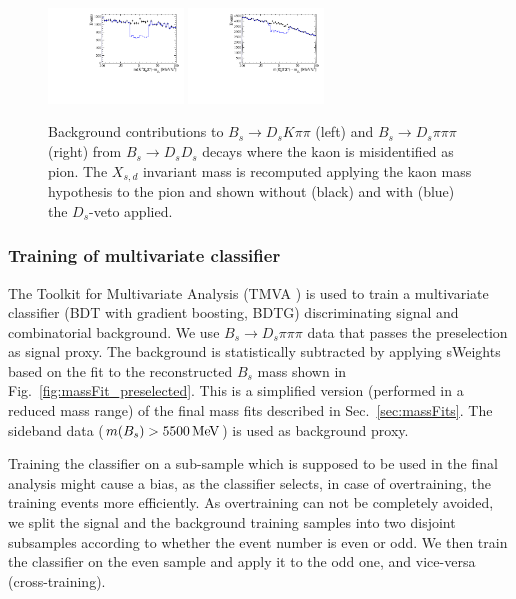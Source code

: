 \begin{figure}[h]
\centering
\includegraphics[height=!,width=0.32\textwidth]{figs/BkgStudies/signal_Bs2DsKpipi_as_Bs2DsDs_compareVeto.pdf} 
\includegraphics[height=!,width=0.32\textwidth]{figs/BkgStudies/norm_Bs2Dspipipi_as_Bs2DsDs_compareVeto.pdf} 
\caption{Background contributions to  $B_s \to D_s K\pi\pi$ (left) and $B_s \to D_s \pi\pi\pi$ (right) from $B_s \to D_s D_s$ decays where the kaon is misidentified as pion.
The $X_{s,d}$ invariant mass is recomputed applying the kaon mass hypothesis to the pion and shown without (black) and with (blue) the $D_s$-veto applied. 
}
\label{fig:vetoDs}
\end{figure}



\clearpage
\subsubsection{Training of multivariate classifier}

The Toolkit for Multivariate Analysis (TMVA \cite{Hocker:2007ht}) is used to train a multivariate classifier (BDT with gradient boosting, BDTG)
discriminating signal and combinatorial background.
We use $B_s\to D_s\pi\pi\pi$ data that passes the preselection as signal proxy. 
The background is statistically subtracted by applying \textsf{sWeights} based on the fit to the reconstructed $B_s$ mass shown in Fig.~\ref{fig:massFit_preselected}.
This is a simplified version (performed in a reduced mass range) of the final mass fits described in Sec.~\ref{sec:massFits}.
The sideband data ($m(B_s) > 5500 \mathrm{\,Me\kern -0.1em V}$) is used as background proxy.

Training the classifier on a sub-sample which is supposed to be used in the
final analysis might cause a bias, as the classifier selects, in case of overtraining,  the training events more efficiently. 
As overtraining can not be completely avoided, we split the signal and
the background training samples into two disjoint subsamples according to whether the
event number is even or odd. We then train the classifier on the even sample and apply
it to the odd one, and vice-versa (cross-training).

